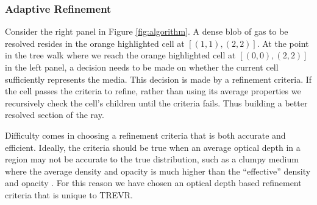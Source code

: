 \documentclass[fleq,usenatbib]{mnras}
\newcommand{\acro}{TREVR}
\begin{document}
\subsubsection{Adaptive Refinement}
Consider the right panel in Figure \ref{fig:algorithm}. A dense blob of gas 
to be resolved resides in the orange highlighted cell at $[(1,1),(2,2)]$. At 
the point in the tree walk where we reach the orange highlighted cell at 
$[(0,0),(2,2)]$ in the left panel, a decision needs to be made on whether the 
current cell sufficiently represents the media. This decision is made by a 
refinement criteria. If the cell passes the criteria to refine, rather than 
using its average properties we recursively check the cell's children until 
the criteria fails. Thus building a better resolved section of the ray. 

Difficulty comes in choosing a refinement criteria that is both accurate and 
efficient. Ideally, the criteria should be true when an average optical depth 
in a region may not be accurate to the true distribution, such as a clumpy 
medium where the average density and opacity is much higher than the 
``effective'' density and opacity \citep{varosiDwek99, hegmanKegel03}. For 
this reason we have chosen an optical depth based refinement criteria that is 
unique to \acro{}.
\end{document}
